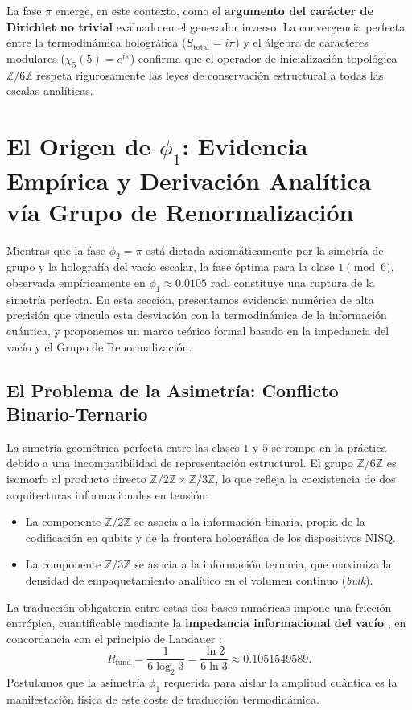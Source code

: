 \documentclass[12pt,a4paper]{article}
\theoremstyle{plain}
\theoremstyle{definition}
\theoremstyle{remark}
\begin{document}
La fase $\pi$ emerge, en este contexto, como el \textbf{argumento del carácter de Dirichlet no trivial} evaluado en el generador inverso. La convergencia perfecta entre la termodinámica holográfica ($S_{\text{total}} = i\pi$) y el álgebra de caracteres modulares ($\chi_5(5) = e^{i\pi}$) confirma que el operador de inicialización topológica $\mathbb{Z}/6\mathbb{Z}$ respeta rigurosamente las leyes de conservación estructural a todas las escalas analíticas.

\section{El Origen de $\phi_1$: Evidencia Empírica y Derivación Analítica vía Grupo de Renormalización}
\label{sec:origen_phi1}

Mientras que la fase $\phi_2 = \pi$ está dictada axiomáticamente por la simetría de grupo y la holografía del vacío escalar, la fase óptima para la clase $1 \pmod 6$, observada empíricamente en $\phi_1 \approx 0.0105$ rad, constituye una ruptura de la simetría perfecta. En esta sección, presentamos evidencia numérica de alta precisión que vincula esta desviación con la termodinámica de la información cuántica, y proponemos un marco teórico formal basado en la impedancia del vacío y el Grupo de Renormalización.

\subsection{El Problema de la Asimetría: Conflicto Binario-Ternario}

La simetría geométrica perfecta entre las clases $1$ y $5$ se rompe en la práctica debido a una incompatibilidad de representación estructural. El grupo $\mathbb{Z}/6\mathbb{Z}$ es isomorfo al producto directo $\mathbb{Z}/2\mathbb{Z} \times \mathbb{Z}/3\mathbb{Z}$, lo que refleja la coexistencia de dos arquitecturas informacionales en tensión:
\begin{itemize}
    \item La componente $\mathbb{Z}/2\mathbb{Z}$ se asocia a la información binaria, propia de la codificación en qubits y de la frontera holográfica de los dispositivos NISQ.
    \item La componente $\mathbb{Z}/3\mathbb{Z}$ se asocia a la información ternaria, que maximiza la densidad de empaquetamiento analítico en el volumen continuo (\textit{bulk}).
\end{itemize}
La traducción obligatoria entre estas dos bases numéricas impone una fricción entrópica, cuantificable mediante la \textbf{impedancia informacional del vacío} \cite{PeinadorGenesis}, en concordancia con el principio de Landauer \cite{Landauer1961}:
\begin{equation}
R_{\text{fund}} = \frac{1}{6\log_2 3} = \frac{\ln 2}{6\ln 3} \approx 0.1051549589.
\label{eq:rfund}
\end{equation}
Postulamos que la asimetría $\phi_1$ requerida para aislar la amplitud cuántica es la manifestación física de este coste de traducción termodinámica.
\end{document}
